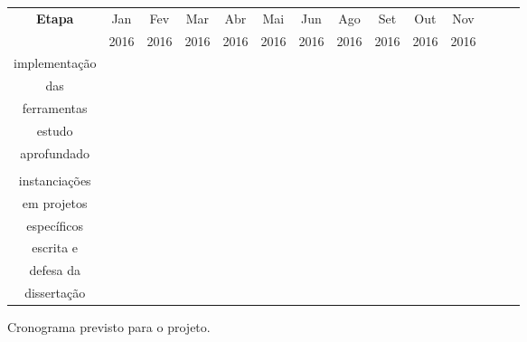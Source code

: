 \begin{figure}[hbt!]
\begin{center}
\begin{tabular}{||c||c|c|c|c|c|c|c|c|c|c|c|c|c||}
\hline\hline
{\bf Etapa} & Jan  & Fev & Mar &  Abr & Mai & Jun & Ago & Set & Out & Nov  \\
            & 2016 & 2016 &2016& 2016 & 2016& 2016& 2016& 2016& 2016& 2016 \\
\hline\hline
implementação       &   &   &   &   &   &   &   &  & &  \\
das                 &   &   &   &   &   &   &   &  & &  \\ 
ferramentas         &   &   &   &   &   &   &   &  & &  \\ \hline

estudo              &   &   &   &   &   &   &   &  & &  \\
aprofundado         &   &   &   &   &   &   &   &  & &  \\ 
		            &   &   &   &   &   &   &   &  & &  \\ \hline

instanciações       &   &   &   &   &   &   &   &  & &  \\ 
em projetos         &   &   &   &   &   &   &   &  & &  \\
específicos         &   &   &   &   &   &   &   &  & &  \\ \hline

escrita e           &   &   &   &   &   &   &   &  & &  \\
defesa  da          &   &   &   &   &   &   &   &  & &  \\
dissertação         &   &   &   &   &   &   &   &  & &  \\ 
\hline\hline
\end{tabular}
\end{center}
\label{fig-cronograma}
\caption{Cronograma previsto para o projeto.}
\end{figure}

